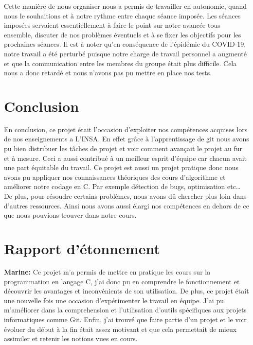 \documentclass{article}
\begin{document}
\medskip
Cette manière de nous organiser nous a permis de travailler en autonomie, quand nous le souhaitions et à notre rythme entre chaque séance imposée. Les séances imposées servaient essentiellement à faire le point sur notre avancée tous ensemble, discuter de nos problèmes éventuels et à se fixer les objectifs pour les prochaines séances. Il est à noter qu'en conséquence de l'épidémie du COVID-19, notre travail a été perturbé puisque notre charge de travail personnel a augmenté et que la communication entre les membres du groupe était plus difficile. Cela nous a donc retardé et nous n'avons pas pu mettre en place nos tests. 

\restoregeometry
\clearpage
\section{Conclusion}
    
En conclusion, ce projet était l’occasion d’exploiter nos compétences acquises lors de nos enseignements a L’INSA. En effet grâce à l'apprentissage de git nous avons pu bien distribuer les tâches de projet et voir comment avançait le projet au fur et à mesure. Ceci a aussi contribué à un meilleur esprit d’équipe car chacun avait une part équitable du travail. Ce projet est aussi un projet pratique donc nous avons pu appliquer nos connaissances théoriques des cours d’algorithme et améliorer notre codage en C. Par exemple détection de bugs, optimisation etc… De plus, pour résoudre certains problèmes, nous avons dû chercher plus loin dans d’autres ressources. Ainsi nous avons aussi élargi nos compétences en dehors de ce que nous pouvions trouver dans notre cours.

\clearpage %

\section{Rapport d'étonnement}
    
    \textbf{Marine:} 
        Ce projet m'a permis de mettre en pratique les cours sur la programmation en langage C, j'ai donc pu en comprendre le fonctionnement et découvrir les avantages et inconvénients de son utilisation. De plus, ce projet était une nouvelle fois une occasion d'expérimenter le travail en équipe. J'ai pu m'améliorer dans la comprehension et l'utilisation d'outils spécifiques aux projets informatiques comme Git. Enfin, j'ai trouvé que faire partie d'un projet et le voir évoluer du début à la fin était assez motivant et que cela permettait de mieux assimiler et retenir les notions vues en cours.
    \medskip
\end{document}
